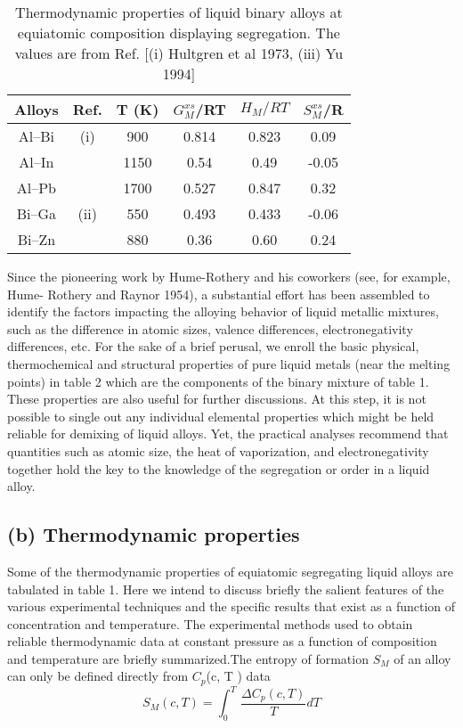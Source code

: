 \documentclass[12pt]{article}
\newcommand*{\1}{\hspace{1pt}}
\begin{document}
 
\begin{table}[t!]
\centering
\caption{Thermodynamic properties of liquid binary alloys at equiatomic composition displaying
segregation. The values are from Ref. [(i) Hultgren et al 1973, (iii) Yu 1994]}
 \begin{tabular}{|c c c c c c|} 
 \hline
 Alloys & Ref. & T (K) & $G ^ {xs} _ {M}$/RT & $H _M/RT$ & $S ^ {xs} _ {M}$/R \\ [0.5ex] 
 \hline\hline
 Al–Bi & (i) & 900 & 0.814 & 0.823 & 0.09 \\ 
 Al–In &     & 1150 & 0.54 & 0.49 & -0.05 \\
 Al–Pb &     & 1700 & 0.527 & 0.847 & 0.32 \\
 Bi–Ga & (ii) & 550 & 0.493 & 0.433 & -0.06 \\
 Bi–Zn &     & 880 & 0.36 & 0.60 & 0.24 \\ [1ex] 
 \hline
 \end{tabular}
\end{table}

    Since the pioneering work by Hume-Rothery and his coworkers (see, for example, Hume-
Rothery and Raynor 1954), a substantial effort has been assembled to identify the factors
impacting the alloying behavior of liquid metallic mixtures, such as the difference in atomic
sizes, valence differences, electronegativity differences, etc. For the sake of a brief perusal, 
we enroll the basic physical, thermochemical and structural properties of pure liquid metals
(near the melting points) in table 2 which are the components of the binary mixture of
table 1. These properties are also useful for further discussions. At this step, it is not
possible to single out any individual elemental properties which might be held reliable
for demixing of liquid alloys. Yet, the practical analyses recommend
that quantities such as atomic size, the heat of vaporization, and electronegativity together hold
the key to the knowledge  of the segregation or order in a liquid alloy.


\subsection*{(b) Thermodynamic properties }


    Some of the thermodynamic properties of equiatomic segregating liquid alloys are tabulated
in table 1. Here we intend to discuss briefly the salient features of the various experimental
techniques and the specific results that exist as a function of concentration and temperature.
The experimental methods used to obtain reliable thermodynamic data at constant pressure
as a function of composition and temperature are briefly summarized.The entropy of formation $S _M$ 
of an alloy can only be defined directly from $C _p$(c, T ) data 
    \begin{equation}
        S _M(c,T) = \int_{0}^{T}  \,\frac{\Delta {C _p(c,T)}}{T} dT 
    \end{equation}                    
    \\
    \\
\end{document}
